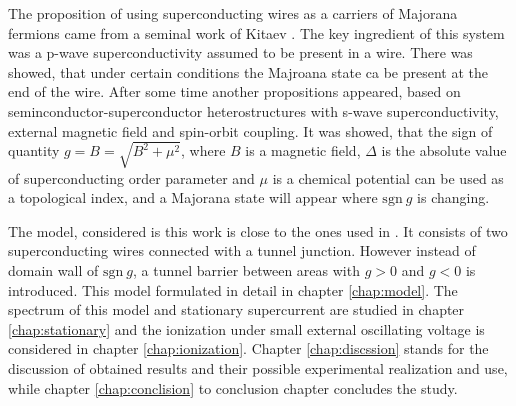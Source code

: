 The proposition of using superconducting wires as a carriers of Majorana fermions came from a seminal work of Kitaev \cite{majorana_condmat_Kitaev}. The key ingredient of this system was a p-wave superconductivity assumed to be present in a wire. There was showed, that under certain conditions the Majroana state ca be present at the end of the wire. After some time another propositions\cite{Oreg_2010}\cite{Lutchyn_2010} appeared, based on seminconductor-superconductor heterostructures with s-wave superconductivity, external magnetic field and spin-orbit coupling. It was showed, that the sign of quantity $ g=B=\sqrt{B^2+\mu^2} $, where $ B $ is a magnetic field, $ \Delta $ is the absolute value of superconducting order parameter and $ \mu $ is a chemical potential can be used as a topological index, and a Majorana state will appear where $ \mathrm{sgn}~g $ is changing.

The model, considered is this work is close to the ones used in \cite{Oreg_2010}\cite{Lutchyn_2010}. It consists of two superconducting wires connected with a tunnel junction. However instead of domain wall of $ \mathrm{sgn}~g $, a tunnel barrier between areas with $ g>0 $ and $ g<0 $ is introduced. This model formulated in detail in chapter \ref{chap:model}. The spectrum of this model and stationary supercurrent are studied in chapter \ref{chap:stationary} and the ionization under small external oscillating voltage is considered in chapter \ref{chap:ionization}. Chapter \ref{chap:discssion}  stands for the discussion of obtained results and their possible experimental realization and use, while chapter \ref{chap:conclision} to conclusion chapter concludes the study.


